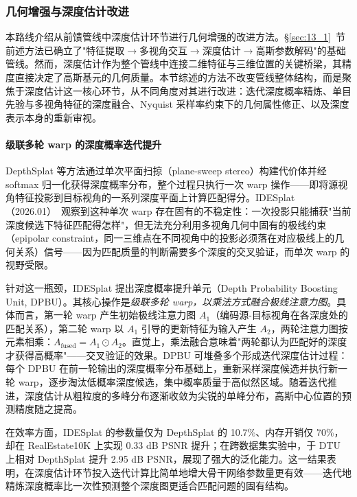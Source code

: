 \subsubsection{几何增强与深度估计改进}

本路线介绍从前馈管线中深度估计环节进行几何增强的改进方法。\S\ref{sec:13_1}~节前述方法已确立了"特征提取$\to$多视角交互$\to$深度估计$\to$高斯参数解码"的基础管线。然而，深度估计作为整个管线中连接二维特征与三维位置的关键桥梁，其精度直接决定了高斯基元的几何质量。本节综述的方法不改变管线整体结构，而是聚焦于深度估计这一核心环节，从不同角度对其进行改进：迭代深度概率精炼、单目先验与多视角特征的深度融合、Nyquist 采样率约束下的几何属性修正、以及深度表示本身的重新审视。

\paragraph{级联多轮 warp 的深度概率迭代提升}

DepthSplat 等方法通过单次平面扫掠（plane-sweep stereo）构建代价体并经 softmax 归一化获得深度概率分布，整个过程只执行一次 warp 操作——即将源视角特征投影到目标视角的一系列深度平面上计算匹配得分。IDESplat（2026.01）~\cite{2601_03824}观察到这种单次 warp 存在固有的不稳定性：一次投影只能捕获"当前深度候选下特征匹配得怎样"，但无法充分利用多视角几何中固有的极线约束（epipolar constraint，同一三维点在不同视角中的投影必须落在对应极线上的几何关系）信号——因为匹配质量的判断需要多个深度的交叉验证，而单次 warp 的视野受限。

针对这一瓶颈，IDESplat 提出深度概率提升单元（Depth Probability Boosting Unit, DPBU）。其核心操作是\emph{级联多轮 warp，以乘法方式融合极线注意力图}。具体而言，第一轮 warp 产生初始极线注意力图 $A_1$（编码源-目标视角在各深度处的匹配关系），第二轮 warp 以 $A_1$ 引导的更新特征为输入产生 $A_2$，两轮注意力图按元素相乘：$A_{\text{fused}} = A_1 \odot A_2$。直觉上，乘法融合意味着"两轮都认为匹配好的深度才获得高概率"——交叉验证的效果。DPBU 可堆叠多个形成迭代深度估计过程：每个 DPBU 在前一轮输出的深度概率分布基础上，重新采样深度候选并执行新一轮 warp，逐步淘汰低概率深度候选，集中概率质量于高似然区域。随着迭代推进，深度估计从粗粒度的多峰分布逐渐收敛为尖锐的单峰分布，高斯中心位置的预测精度随之提高。

在效率方面，IDESplat 的参数量仅为 DepthSplat 的 10.7\%、内存开销仅 70\%，却在 RealEstate10K 上实现 0.33 dB PSNR 提升；在跨数据集实验中，于 DTU 上相对 DepthSplat 提升 2.95 dB PSNR，展现了强大的泛化能力。这一结果表明，在深度估计环节投入迭代计算比简单地增大骨干网络参数量更有效——迭代地精炼深度概率比一次性预测整个深度图更适合匹配问题的固有结构。

